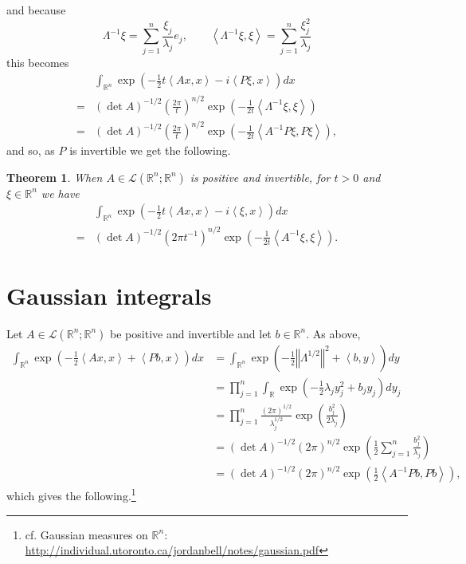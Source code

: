 \documentclass{article}
\newcommand{\inner}[2]{\left\langle #1, #2 \right\rangle}
\newcommand{\norm}[1]{\left\Vert #1 \right\Vert}
\newtheorem{theorem}{Theorem}
\theoremstyle{definition}
\begin{document}
and because
\[
\Lambda^{-1} \xi = \sum_{j=1}^n \frac{\xi_j}{\lambda_j} e_j,\qquad
\inner{\Lambda^{-1} \xi}{\xi}=\sum_{j=1}^n \frac{\xi_j^2}{\lambda_j}
\]
this becomes
\[
\begin{split}
&\int_{\mathbb{R}^n} \exp\left(-\frac{1}{2}t \inner{Ax}{x}-i\inner{P\xi}{x}\right) dx\\
=&(\det A)^{-1/2} \left(\frac{2\pi}{t}\right)^{n/2} \exp\left(-\frac{1}{2t} \inner{\Lambda^{-1}\xi}{\xi} \right)\\
=&(\det A)^{-1/2} \left(\frac{2\pi}{t}\right)^{n/2} \exp\left(-\frac{1}{2t}\inner{A^{-1}P\xi}{P\xi}\right),
\end{split}
\]
and so, as $P$ is invertible we get the following.

\begin{theorem}
When $A \in \mathscr{L}(\mathbb{R}^n;\mathbb{R}^n)$ is positive and invertible,
for $t>0$ and $\xi \in \mathbb{R}^n$   we have
\[
\begin{split}
&\int_{\mathbb{R}^n} \exp\left(-\frac{1}{2}t \inner{Ax}{x}-i\inner{\xi}{x}\right) dx\\
=&(\det A)^{-1/2} \left(2\pi t^{-1}\right)^{n/2} \exp\left(-\frac{1}{2t}\inner{A^{-1}\xi}{\xi}\right).
\end{split}
\]
\end{theorem}


\section{Gaussian integrals}
Let $A \in \mathscr{L}(\mathbb{R}^n;\mathbb{R}^n)$ be positive and invertible and let
$b \in \mathbb{R}^n$. 
As above,
\begin{align*}
\int_{\mathbb{R}^n} \exp\left(-\frac{1}{2}\inner{Ax}{x}+\inner{P b}{x} \right)dx&=\int_{\mathbb{R}^n} \exp\left(-\frac{1}{2}\norm{\Lambda^{1/2}}^2
+\inner{b}{y}\right) dy\\
&=\prod_{j=1}^n \int_{\mathbb{R}} \exp\left(-\frac{1}{2}\lambda_j y_j^2 + b_j y_j\right)
dy_j\\
&=\prod_{j=1}^n \frac{(2\pi)^{1/2}}{\lambda_j^{1/2}} \exp\left(\frac{b_j^2}{2\lambda_j}\right)\\
&=(\det A)^{-1/2} (2\pi)^{n/2} \exp\left(\frac{1}{2} \sum_{j=1}^n \frac{b_j^2}{\lambda_j} \right)\\
&=(\det A)^{-1/2} (2\pi)^{n/2} \exp\left(\frac{1}{2} \inner{A^{-1}Pb}{Pb}\right),
\end{align*}
which gives the following.\footnote{cf. Gaussian measures on $\mathbb{R}^n$:
\url{http://individual.utoronto.ca/jordanbell/notes/gaussian.pdf}}
\end{document}
